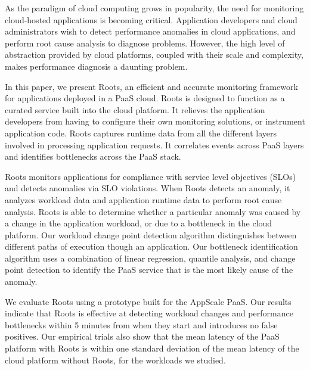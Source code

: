 As the paradigm of cloud computing grows in popularity, the need for monitoring cloud-hosted 
applications is becoming critical. Application developers and cloud administrators
wish to detect performance anomalies in cloud applications, and
perform root cause analysis to diagnose problems. However, the high level of abstraction provided by cloud
platforms, coupled with their scale and complexity, makes performance diagnosis
a daunting problem. %

In this paper, we present Roots, an efficient and accurate 
monitoring framework for applications deployed in a PaaS cloud. 
Roots is designed to function as a curated service
built into the cloud platform. 
It relieves the application developers from having to configure
their own monitoring solutions, or instrument application code.
Roots captures runtime data from all the different layers involved
in processing application requests. It correlates events across PaaS layers and
identifies bottlenecks across the PaaS stack.

Roots monitors applications for compliance with service level objectives (SLOs) and detects anomalies via SLO violations.
When Roots detects an anomaly, 
it analyzes workload data and application runtime data
to perform root cause analysis. Roots is able to determine whether a particular
anomaly was caused by a change in the application workload, or due to a bottleneck
in the cloud platform. 
Our workload change point detection algorithm
distinguishes between different paths
of execution though an application.  Our bottleneck identification algorithm
uses a combination of linear regression, quantile analysis, 
and change point detection to identify the PaaS service that is 
the most likely cause of the anomaly. 

We evaluate Roots using a prototype built for the AppScale PaaS. 
Our results indicate that Roots is effective at detecting 
workload changes and performance bottlenecks within 5 
minutes from when they start and introduces no false positives.
Our empirical trials also show that the mean latency of the 
PaaS platform with Roots is within one standard deviation of the mean
latency of the cloud platform without Roots, for the workloads we studied. 

